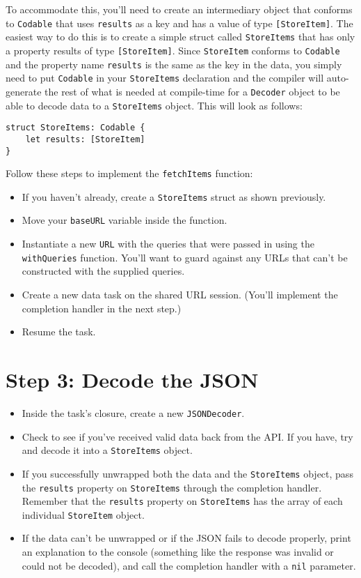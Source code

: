 \documentclass[a4paper,11pt]{scrartcl}
\begin{document}
To accommodate this, you'll need to create an intermediary object that conforms to \texttt{Codable} that uses \texttt{results} as a key and has a value of type \texttt{[StoreItem]}. The easiest way to do this is to create a simple struct called \texttt{StoreItems} that has only a property results of type \texttt{[StoreItem]}. Since \texttt{StoreItem} conforms to \texttt{Codable} and the property name \texttt{results} is the same as the key in the data, you simply need to put \texttt{Codable} in your \texttt{StoreItems} declaration and the compiler will auto-generate the rest of what is needed at compile-time for a \texttt{Decoder} object to be able to decode data to a \texttt{StoreItems} object. This will look as follows:
\begin{lstlisting}
struct StoreItems: Codable {
    let results: [StoreItem]
}
\end{lstlisting}

Follow these steps to implement the \texttt{fetchItems} function:
\begin{itemize}
\item If you haven't already, create a \texttt{StoreItems} struct as shown previously.
\item Move your \texttt{baseURL} variable inside the function.
\item Instantiate a new \texttt{URL} with the queries that were passed in using the \texttt{withQueries} function. You'll want to guard against any URLs that can't be constructed with the supplied queries.
\item Create a new data task on the shared URL session. (You'll implement the completion handler in the next step.)
\item Resume the task.
\end{itemize}

\section*{Step 3: Decode the JSON}

\begin{itemize}
\item Inside the task's closure, create a new \texttt{JSONDecoder}.
\item Check to see if you've received valid data back from the API. If you have, try and decode it into a \texttt{StoreItems} object.
\item If you successfully unwrapped both the data and the \texttt{StoreItems} object, pass the \texttt{results} property on \texttt{StoreItems} through the completion handler. Remember that the \texttt{results} property on \texttt{StoreItems} has the array of each individual \texttt{StoreItem} object.
\item If the data can't be unwrapped or if the JSON fails to decode properly, print an explanation to the console (something like the response was invalid or could not be decoded), and call the completion handler with a \texttt{nil} parameter.
\end{itemize}
\end{document}
